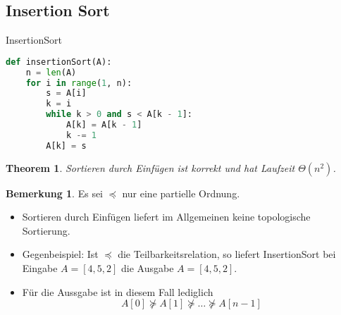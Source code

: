 \documentclass[a4paper,12pt]{article}
\newtheorem{theorem}[axiom]{Theorem}
\theoremstyle{definition}
\newtheorem*{bemerkung}{Bemerkung}
\begin{document}
	\subsection{Insertion Sort}
	\begin{algorithm}[H]
		\caption{InsertionSort}
	\end{algorithm}
	\begin{lstlisting}[language=Python]
def insertionSort(A):
	n = len(A)
	for i in range(1, n):
		s = A[i]
		k = i
		while k > 0 and s < A[k - 1]:
			A[k] = A[k - 1]
			k -= 1
		A[k] = s\end{lstlisting}
	\begin{theorem}
		Sortieren durch Einfügen ist korrekt und hat Laufzeit $\Theta(n^2)$.
	\end{theorem}
	\begin{bemerkung}
		Es sei $\preceq$ nur eine partielle Ordnung.
		\begin{itemize}
			\item Sortieren durch Einfügen liefert im Allgemeinen keine topologische Sortierung.
			\item Gegenbeispiel: Ist $\preceq$ die Teilbarkeitsrelation, so liefert InsertionSort bei Eingabe $A = [4, 5, 2]$ die Ausgabe $A = [4, 5, 2]$.
			\item Für die Aussgabe ist in diesem Fall lediglich
			\[
				A[0] \nsucceq A[1] \nsucceq \ldots \nsucceq A[n - 1]
			\]
		\end{itemize}
	\end{bemerkung}
\end{document}
